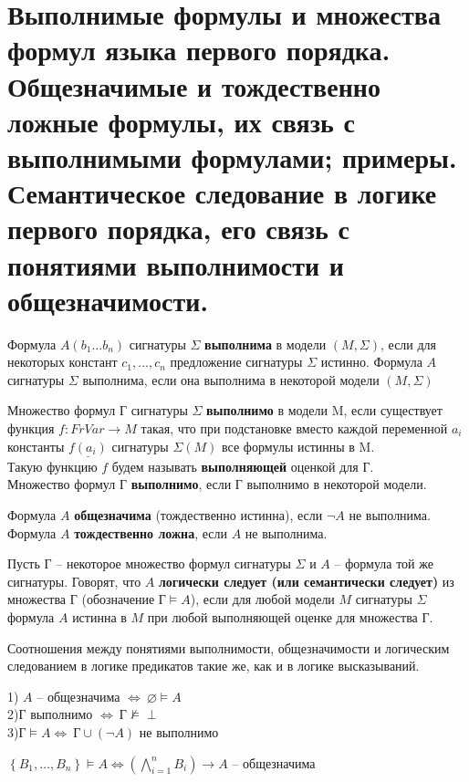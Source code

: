 \section[Выполнимые формулы и множества формул языка первого порядка. Общезначимые и тождественно ложные формулы,
их связь с выполнимыми формулами; примеры. Семантическое следование в логике первого порядка, его связь с понятиями
выполнимости и общезначимости.]{\sloppy Выполнимые формулы и множества формул языка первого порядка. Общезначимые и
тождественно ложные формулы, их связь с выполнимыми формулами; примеры. Семантическое следование в логике первого
порядка, его связь с понятиями выполнимости и общезначимости.}
\begin{definition}
	Формула $A(b_1\dots b_n)$ сигнатуры $\Sigma$ \textbf{выполнима} в модели $(M,\Sigma)$, если для некоторых
	констант $c_1,\dots,c_n$ предложение
	сигнатуры $\Sigma$ истинно. Формула $A$ сигнатуры $\Sigma$ выполнима, если она выполнима в некоторой модели
	$(M,\Sigma)$
\end{definition}
\begin{definition}
	Множество формул Г сигнатуры $\Sigma$ \textbf{выполнимо} в модели M, если существует функция $f: FrVar
	\rightarrow M$ такая, что при подстановке вместо каждой переменной $a_i$  константы $\underline{f(a_i)}$
	сигнатуры $\Sigma(M)$ все формулы истинны в M.\\Такую функцию $f$ будем называть \textbf{выполняющей} оценкой
	для Г.\\ Множество формул Г \textbf{выполнимо}, если Г выполнимо в некоторой модели.
\end{definition}
\begin{definition}
    Формула $A$ \textbf{общезначима} (тождественно истинна), если $\neg A$ не выполнима.\\
    Формула $A$ \textbf{тождественно ложна}, если $A$ не выполнима.
\end{definition}
\begin{definition}
	Пусть Г -- некоторое множество формул сигнатуры $\Sigma$ и $A$ -- формула той же сигнатуры. Говорят, что $A$
	\textbf{логически следует (или семантически следует)} из множества Г (обозначение $\text{Г}\vDash A$), если для
	любой модели $M$ сигнатуры $\Sigma$ формула $A$ истинна в $M$ при любой выполняющей оценке для множества Г.
	\label{formula7}
\end{definition}
Соотношения между понятиями выполнимости, общезначимости и логическим следованием в логике предикатов такие же, как
и в логике высказываний.
\begin{proposition}
    1) $A$ -- общезначима $\Longleftrightarrow \: \varnothing \vDash A$\\
    2)Г выполнимо  $\Longleftrightarrow \:\text{Г}\nvDash \perp$\\
    3)$\text{Г} \vDash A \Longleftrightarrow \: \text{Г}\cup (\neg A)$ не выполнимо
\end{proposition}
\begin{proposition}
	$\left\{B_{1}, \ldots, B_{n}\right\} \vDash A \Longleftrightarrow\left(\bigwedge_{i=1}^{n} B_{i}\right)
	\rightarrow A$ -- общезначима
\end{proposition}
